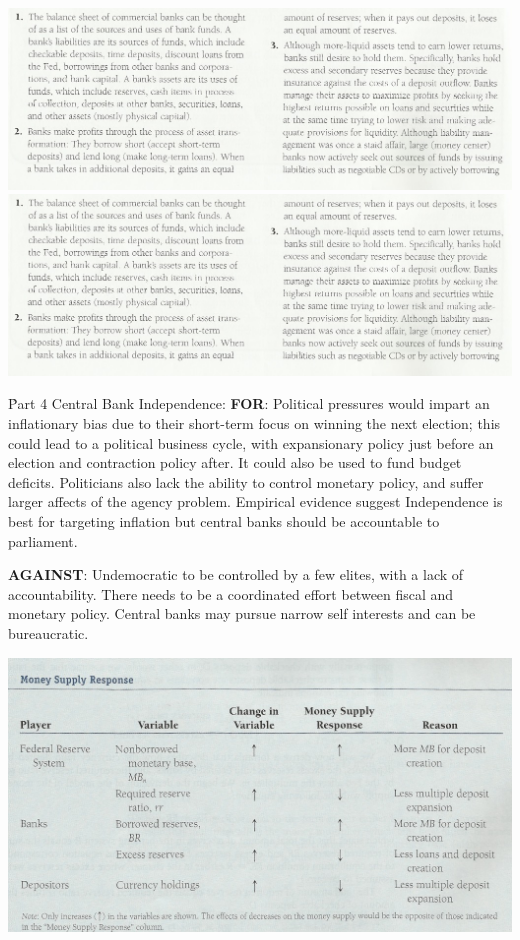 \documentclass[12pt]{examnotes}
\begin{document}
\begin{center}
  \includegraphics[scale=0.45]{./imgs/c11sum1.jpg}
  \includegraphics[scale=0.45]{./imgs/c11sum1.jpg}
\end{center}

\h{Part 4}
Central Bank Independence:
\textbf{FOR}: Political pressures would impart an inflationary bias due to their short-term focus on winning the next election; this could lead to a political business cycle, with expansionary policy just before an election and contraction policy after. It could also be used to fund budget deficits. Politicians also lack the ability to control monetary policy, and suffer larger affects of the agency problem. Empirical evidence suggest Independence is best for targeting inflation but central banks should be accountable to parliament.

\textbf{AGAINST}: 
Undemocratic to be controlled by a few elites, with a lack of accountability. There needs to be a coordinated effort between fiscal and monetary policy. Central banks may pursue narrow self interests and can be bureaucratic. 

\begin{center}
  \includegraphics[scale=0.5]{./imgs/moneysupplytable.jpg}
\end{center}
\end{document}
